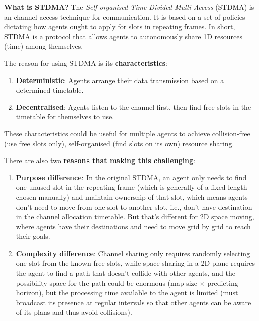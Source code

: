 \textbf{What is STDMA?} The \textit{Self-organised Time Divided Multi Access} (STDMA)
 is an channel access technique for communication. 
 It is based on a set of policies dictating how agents ought to apply for
  slots in repeating frames. 
  In short, STDMA is a protocol that allows agents to autonomously
   share 1D resources (time) among themselves.


The reason for using STDMA is its \textbf{characteristics}:

\begin{enumerate}
    \item \textbf{Deterministic}: Agents arrange their data transmission based on a determined timetable.
    \item \textbf{Decentralised}: Agents listen to the channel first, then find free slots in the timetable for themselves to use.
\end{enumerate}

These characteristics could be useful for multiple agents to achieve collision-free (use free slots only),
 self-organised (find slots on its own) resource sharing.

There are also two \textbf{reasons that making this challenging}: 

\begin{enumerate}
    \item \textbf{Purpose difference}: In the original STDMA, an agent only needs to find one unused slot
    in the repeating frame (which is generally of a fixed length chosen manually) and maintain ownership of that slot,
    which means agents don't need to move from one slot to another slot, i.e., don't have destination in the channel allocation timetable. 
    But that's different for 2D space moving, where agents have their destinations and need to move grid by grid to reach their goals.
    \item \textbf{Complexity difference}: Channel sharing only requires randomly selecting one slot from the known free slots, while space sharing in
     a 2D plane requires the agent to find a path that doesn't collide with other agents, and the possibility space for the path could be enormous
      (map size $\times$ predicting horizon), but the processing time available to the agent is limited
       (must broadcast its presence at regular intervals so that other agents can be aware of its plans and thus avoid collisions).
\end{enumerate}


